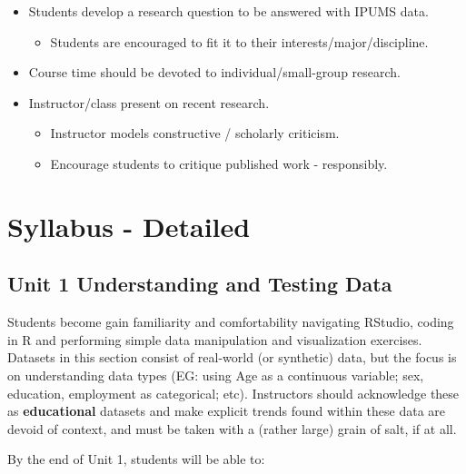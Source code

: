\documentclass[
]{book}
\providecommand{\tightlist}{%
  \setlength{\itemsep}{0pt}\setlength{\parskip}{0pt}}
\begin{document}
\begin{itemize}
\tightlist
\item
  Students develop a research question to be answered with IPUMS data.

  \begin{itemize}
  \tightlist
  \item
    Students are encouraged to fit it to their interests/major/discipline.
  \end{itemize}
\item
  Course time should be devoted to individual/small-group research.
\item
  Instructor/class present on recent research.

  \begin{itemize}
  \tightlist
  \item
    Instructor models constructive / scholarly criticism.
  \item
    Encourage students to critique published work - responsibly.
  \end{itemize}
\end{itemize}

\hypertarget{syllabus---detailed}{%
\section*{Syllabus - Detailed}\label{syllabus---detailed}}

\hypertarget{unit-1-understanding-and-testing-data}{%
\subsection*{Unit 1 Understanding and Testing Data}\label{unit-1-understanding-and-testing-data}}

Students become gain familiarity and comfortability navigating RStudio, coding in R and performing simple data manipulation and visualization exercises. Datasets in this section consist of real-world (or synthetic) data, but the focus is on understanding data types (EG: using Age as a continuous variable; sex, education, employment as categorical; etc). Instructors should acknowledge these as \textbf{educational} datasets and make explicit trends found within these data are devoid of context, and must be taken with a (rather large) grain of salt, if at all.

By the end of Unit 1, students will be able to:
\end{document}
